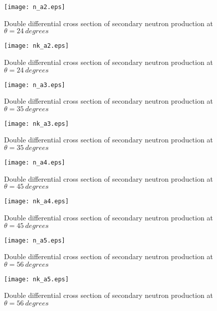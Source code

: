 \documentclass[12pt]{article}
\begin{document}
\begin{figure}[htbp]
\caption{Double differential cross section of secondary neutron production at $\theta = 24~degrees$}
\label{figa2} 
\centerline{\texttt{[image: n\_a2.eps]}}
\end{figure}

\begin{figure}[htbp]
\caption{Double differential cross section of secondary neutron production at $\theta = 24~degrees$}
\label{figa2a} 
\centerline{\texttt{[image: nk\_a2.eps]}}
\end{figure}

\clearpage

\begin{figure}[htbp]
\caption{Double differential cross section of secondary neutron production at $\theta = 35~degrees$}
\label{figa3} 
\centerline{\texttt{[image: n\_a3.eps]}}
\end{figure}

\begin{figure}[htbp]
\caption{Double differential cross section of secondary neutron production at $\theta = 35~degrees$}
\label{figa3a} 
\centerline{\texttt{[image: nk\_a3.eps]}}
\end{figure}

\begin{figure}[htbp]
\caption{Double differential cross section of secondary neutron production at $\theta = 45~degrees$}
\label{figa4} 
\centerline{\texttt{[image: n\_a4.eps]}}
\end{figure}

\begin{figure}[htbp]
\caption{Double differential cross section of secondary neutron production at $\theta = 45~degrees$}
\label{figa4a} 
\centerline{\texttt{[image: nk\_a4.eps]}}
\end{figure}



\begin{figure}[htbp]
\caption{Double differential cross section of secondary neutron production at $\theta = 56~degrees$}
\label{figa5} 
\centerline{\texttt{[image: n\_a5.eps]}}
\end{figure}

\begin{figure}[htbp]
\caption{Double differential cross section of secondary neutron production at $\theta = 56~degrees$}
\label{figa5a} 
\centerline{\texttt{[image: nk\_a5.eps]}}
\end{figure}
\end{document}
